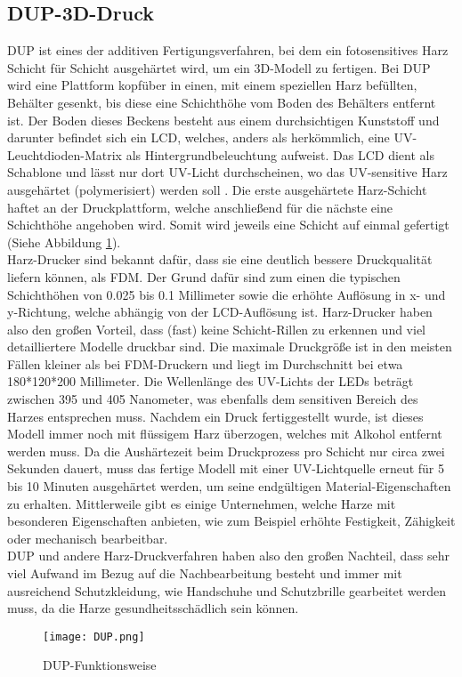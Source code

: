 \subsection{DUP-3D-Druck}
\label{subsec:tDUP}
\ac{DUP} ist eines der additiven Fertigungsverfahren, bei dem ein fotosensitives Harz Schicht für Schicht ausgehärtet wird, um ein \ac{3D}-Modell zu fertigen. Bei \ac{DUP} wird eine Plattform kopfüber in einen, mit einem speziellen Harz befüllten, Behälter gesenkt, bis diese eine Schichthöhe vom Boden des Behälters entfernt ist. Der Boden dieses Beckens besteht aus einem durchsichtigen Kunststoff und darunter befindet sich ein \ac{LCD}, welches, anders als herkömmlich, eine \ac{UV}-Leuchtdioden-Matrix als Hintergrundbeleuchtung aufweist. Das \ac{LCD} dient als Schablone und lässt nur dort \ac{UV}-Licht durchscheinen, wo das \ac{UV}-sensitive Harz ausgehärtet (polymerisiert) werden soll . Die erste ausgehärtete Harz-Schicht haftet an der Druckplattform, welche anschließend für die nächste eine Schichthöhe angehoben wird. Somit wird jeweils eine Schicht auf einmal gefertigt (Siehe Abbildung \ref{fig:DUP}).\\ Harz-Drucker sind bekannt dafür, dass sie eine deutlich bessere Druckqualität liefern können, als \ac{FDM}. Der Grund dafür sind zum einen die typischen Schichthöhen von 0.025 bis 0.1 Millimeter sowie die erhöhte Auflösung in x- und y-Richtung, welche abhängig von der \ac{LCD}-Auflösung ist.  Harz-Drucker haben also den großen Vorteil, dass (fast) keine Schicht-Rillen zu erkennen und viel detailliertere Modelle druckbar sind. Die maximale Druckgröße ist in den meisten Fällen kleiner als bei \ac{FDM}-Druckern und liegt im Durchschnitt bei etwa 180*120*200 Millimeter. Die Wellenlänge des \ac{UV}-Lichts der LEDs beträgt zwischen 395 und 405 Nanometer, was ebenfalls dem sensitiven Bereich des Harzes entsprechen muss. Nachdem ein Druck fertiggestellt wurde, ist dieses Modell immer noch mit flüssigem Harz überzogen, welches mit Alkohol entfernt werden muss. Da die Aushärtezeit beim Druckprozess pro Schicht nur circa zwei Sekunden dauert, muss das fertige Modell mit einer \ac{UV}-Lichtquelle erneut für 5 bis 10 Minuten ausgehärtet werden, um seine endgültigen Material-Eigenschaften zu erhalten. Mittlerweile gibt es einige Unternehmen, welche Harze mit besonderen Eigenschaften anbieten, wie zum Beispiel erhöhte Festigkeit, Zähigkeit oder mechanisch bearbeitbar.\\
\ac{DUP} und andere Harz-Druckverfahren haben also den großen Nachteil, dass sehr viel Aufwand im Bezug auf die Nachbearbeitung besteht und immer mit ausreichend Schutzkleidung, wie Handschuhe und Schutzbrille gearbeitet werden muss, da die Harze gesundheitsschädlich sein können.
\begin{figure}[h]
\centering
\texttt{[image: DUP.png]}
\caption{DUP-Funktionsweise}
\label{fig:DUP}
\end{figure}